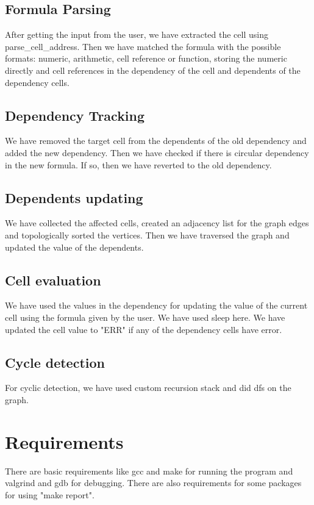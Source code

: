 \documentclass{article}
\begin{document}
\subsection{Formula Parsing}
After getting the input from the user, we have extracted the cell using parse\_cell\_address.
Then we have matched the formula with the possible formats: numeric, arithmetic, cell reference or function, storing the numeric directly and cell references in the dependency of the cell and dependents of the dependency cells.

\subsection{Dependency Tracking}
We have removed the target cell from the dependents of the old dependency and added the new dependency. Then we have checked if there is circular dependency in the new formula. If so, then we have reverted to the old dependency. 

\subsection{Dependents updating}
    We have collected the affected cells, created an adjacency list for the graph edges and topologically sorted the vertices. Then we have traversed the graph and updated the value of the dependents.
    
\subsection{Cell evaluation}
    We have used the values in the dependency for updating the value of the current cell using the formula given by the user. We have used sleep here. We have updated the cell value to "ERR" if any of the dependency cells have error.

\subsection{Cycle detection}
    For cyclic detection, we have used custom recursion stack and did dfs on the graph.

\section{Requirements}
There are basic requirements like gcc and make for running the program and valgrind and gdb for debugging. There are also requirements for some packages for using "make report".
\end{document}
